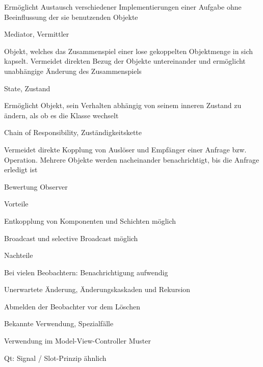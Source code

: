 \documentclass[a4paper]{article}
\begin{document}
\begin{multicols}{3}
\begin{itemize*}
    \begin{itemize*}
      \item Ermöglicht Austausch verschiedener Implementierungen einer Aufgabe ohne Beeinflussung der sie benutzenden Objekte
    \end{itemize*}
    \item Mediator, Vermittler
    \begin{itemize*}
      \item Objekt, welches das Zusammenspiel einer lose gekoppelten Objektmenge in sich kapselt. Vermeidet direkten Bezug der Objekte untereinander und ermöglicht unabhängige Änderung des Zusammenspiels
    \end{itemize*}
    \item State, Zustand
    \begin{itemize*}
      \item Ermöglicht Objekt, sein Verhalten abhängig von seinem inneren Zustand zu ändern, als ob es die Klasse wechselt
    \end{itemize*}
    \item Chain of Responsibility, Zuständigkeitskette
    \begin{itemize*}
      \item Vermeidet direkte Kopplung von Auslöser und Empfänger einer Anfrage bzw. Operation. Mehrere Objekte werden nacheinander benachrichtigt, bis die Anfrage erledigt ist
    \end{itemize*}
  \end{itemize*}

  Bewertung Observer
  \begin{itemize*}
    \item Vorteile
    \begin{itemize*}
      \item Entkopplung von Komponenten und Schichten möglich
      \item Broadcast und selective Broadcast möglich
    \end{itemize*}
    \item Nachteile
    \begin{itemize*}
      \item Bei vielen Beobachtern: Benachrichtigung aufwendig
      \item Unerwartete Änderung, Änderungskaskaden und Rekursion
      \item Abmelden der Beobachter vor dem Löschen
    \end{itemize*}
    \item Bekannte Verwendung, Spezialfälle
    \begin{itemize*}
      \item Verwendung im Model-View-Controller Muster
      \item Qt: Signal / Slot-Prinzip ähnlich
    \end{itemize*}
  \end{itemize*}


\end{multicols}
\end{document}
